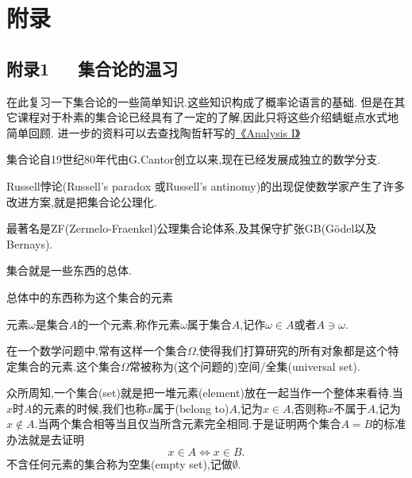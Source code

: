 \chapter{附\qquad{}录}

{}
\section*{附录1~~~集合论的温习} %

在此复习一下集合论的一些简单知识.这些知识构成了概率论语言的基础. 但是在其它课程对于朴素的集合论已经具有了一定的了解,因此只将这些介绍蜻蜓点水式地简单回顾. 进一步的资料可以去查找陶哲轩写的\href{https://www.springer.com/cn/book/9789811017896}{《Analysis I》}

\begin{blist}
	\item 集合论自19世纪80年代由G.Cantor创立以来,现在已经发展成独立的数学分支.
	\item Russell悖论(Russell's paradox 或Russell's antinomy)的出现促使数学家产生了许多改进方案,就是把集合论公理化.
	\item 最著名是ZF(Zermelo-Fraenkel)公理集合论体系,及其保守扩张GB(Gödel以及Bernays).
\end{blist}

\begin{definition}[集合]
\begin{blist}
	\item 集合就是一些东西的总体.
	\item 总体中的东西称为这个集合的元素
	\item 元素$\omega$是集合$A$的一个元素,称作元素$\omega$属于集合$A$,记作$\omega\in A$或者$A\ni\omega$.
	\item 在一个数学问题中,常有这样一个集合$\Omega$,使得我们打算研究的所有对象都是这个特定集合的元素.这个集合$\Omega$常被称为(这个问题的)空间/全集(universal set).
\end{blist}	
\end{definition}

众所周知,一个集合(set)就是把一堆元素(element)放在一起当作一个整体来看待.当$x$时$A$的元素的时候,我们也称$x$属于(belong to)$A$,记为$x\in A$,否则称$x$不属于$A$,记为$x\notin A$.当两个集合相等当且仅当所含元素完全相同.于是证明两个集合$A=B$的标准办法就是去证明\begin{equation}
x\in A\Longleftrightarrow x\in B.
\end{equation}
不含任何元素的集合称为空集(empty set),记做$\emptyset$.

